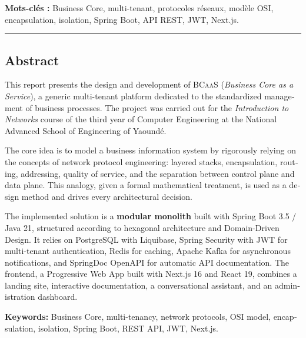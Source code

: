 \documentclass[12pt,a4paper]{report}
\theoremstyle{definition}
\theoremstyle{remark}
\newcommand{\bcaas}{\textsc{BCaaS}}
\newcommand{\jwt}{\textsc{JWT}}
\begin{document}
\textbf{Mots-clés :} Business Core, multi-tenant, protocoles réseaux, modèle OSI, encapsulation, isolation, Spring Boot, API REST, JWT, Next.js.

\vspace{0.8cm}
\begin{center}
	{\color{primary}\rule{0.5\textwidth}{0.5pt}}
\end{center}

\begin{otherlanguage}{english}
\chapter*{Abstract}

This report presents the design and development of \bcaas{} (\textit{Business Core as a Service}), a generic multi-tenant platform dedicated to the standardized management of business processes. The project was carried out for the \textit{Introduction to Networks} course of the third year of Computer Engineering at the National Advanced School of Engineering of Yaoundé.

The core idea is to model a business information system by rigorously relying on the concepts of network protocol engineering: layered stacks, encapsulation, routing, addressing, quality of service, and the separation between control plane and data plane. This analogy, given a formal mathematical treatment, is used as a design method and drives every architectural decision.

The implemented solution is a \textbf{modular monolith} built with Spring Boot 3.5 / Java 21, structured according to hexagonal architecture and Domain-Driven Design. It relies on PostgreSQL with Liquibase, Spring Security with \jwt{} for multi-tenant authentication, Redis for caching, Apache Kafka for asynchronous notifications, and SpringDoc OpenAPI for automatic API documentation. The frontend, a Progressive Web App built with Next.js 16 and React 19, combines a landing site, interactive documentation, a conversational assistant, and an administration dashboard.

\textbf{Keywords:} Business Core, multi-tenancy, network protocols, OSI model, encapsulation, isolation, Spring Boot, REST API, JWT, Next.js.
\end{otherlanguage}
\end{document}
